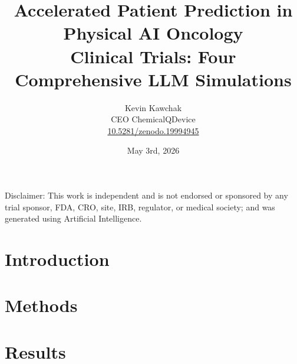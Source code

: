\documentclass{article}
\title{Accelerated Patient Prediction in Physical AI Oncology\\
Clinical Trials: Four Comprehensive LLM Simulations}
\author{
  Kevin Kawchak\hspace{2pt}\orcidicon{0009-0007-5457-8667} \\
  CEO ChemicalQDevice\\
  \href{https://doi.org/10.5281/zenodo.19994945}{10.5281/zenodo.19994945} \\
}
\date{May 3rd, 2026}
\begin{document}
\maketitle

\begin{abstract}

\end{abstract}

\begin{center}
\footnotesize
Disclaimer: This work is independent and is not endorsed or sponsored by any
trial sponsor, FDA, CRO, site, IRB, regulator, or medical society; and was
generated using Artificial Intelligence.
\end{center}


\vspace{-0.2cm}

\section{Introduction}
\label{sec:introduction}


\newpage
\tableofcontents
\newpage

\section{Methods}
\label{sec:methods}

\newpage

\section{Results}
\label{sec:results}

\newpage
\end{document}
